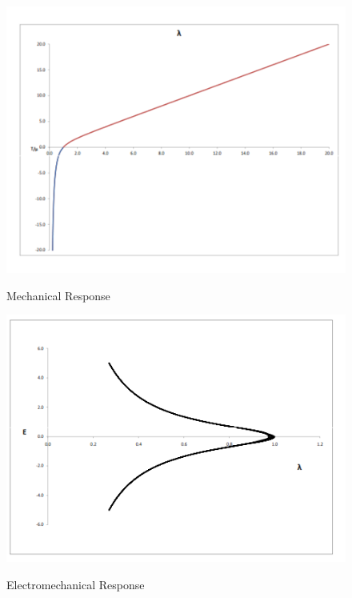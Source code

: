 \documentclass{beamer}
\begin{document}
\begin{frame}

\begin{figure}
\centering
\includegraphics[scale=0.3,trim = 0mm 0mm 0mm
00mm]{../images/eap_stress_stretch.png}
\label{fig:mechanical}
\caption{Mechanical Response}
\end{figure} 
\begin{figure}
\centering
\includegraphics[scale=0.3,trim = 0mm 0mm 0mm
00mm]{../images/eap_elect_stretch.png}
\label{fig:mechanical_}

\caption{Electromechanical Response}

\end{figure} 

\end{frame}
\end{document}
